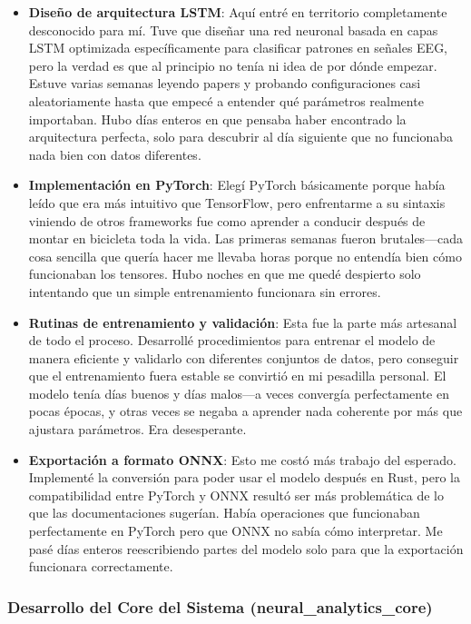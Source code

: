 \begin{itemize}
    \item \textbf{Diseño de arquitectura LSTM}: Aquí entré en territorio completamente desconocido para mí. Tuve que diseñar una red neuronal basada en capas LSTM optimizada específicamente para clasificar patrones en señales EEG, pero la verdad es que al principio no tenía ni idea de por dónde empezar. Estuve varias semanas leyendo papers y probando configuraciones casi aleatoriamente hasta que empecé a entender qué parámetros realmente importaban. Hubo días enteros en que pensaba haber encontrado la arquitectura perfecta, solo para descubrir al día siguiente que no funcionaba nada bien con datos diferentes.
    
    \item \textbf{Implementación en PyTorch}: Elegí PyTorch básicamente porque había leído que era más intuitivo que TensorFlow, pero enfrentarme a su sintaxis viniendo de otros frameworks fue como aprender a conducir después de montar en bicicleta toda la vida. Las primeras semanas fueron brutales—cada cosa sencilla que quería hacer me llevaba horas porque no entendía bien cómo funcionaban los tensores. Hubo noches en que me quedé despierto solo intentando que un simple entrenamiento funcionara sin errores.
    
    \item \textbf{Rutinas de entrenamiento y validación}: Esta fue la parte más artesanal de todo el proceso. Desarrollé procedimientos para entrenar el modelo de manera eficiente y validarlo con diferentes conjuntos de datos, pero conseguir que el entrenamiento fuera estable se convirtió en mi pesadilla personal. El modelo tenía días buenos y días malos—a veces convergía perfectamente en pocas épocas, y otras veces se negaba a aprender nada coherente por más que ajustara parámetros. Era desesperante.
    
    \item \textbf{Exportación a formato ONNX}: Esto me costó más trabajo del esperado. Implementé la conversión para poder usar el modelo después en Rust, pero la compatibilidad entre PyTorch y ONNX resultó ser más problemática de lo que las documentaciones sugerían. Había operaciones que funcionaban perfectamente en PyTorch pero que ONNX no sabía cómo interpretar. Me pasé días enteros reescribiendo partes del modelo solo para que la exportación funcionara correctamente.
\end{itemize}

\subsubsection{Desarrollo del Core del Sistema (neural\_analytics\_core)}

